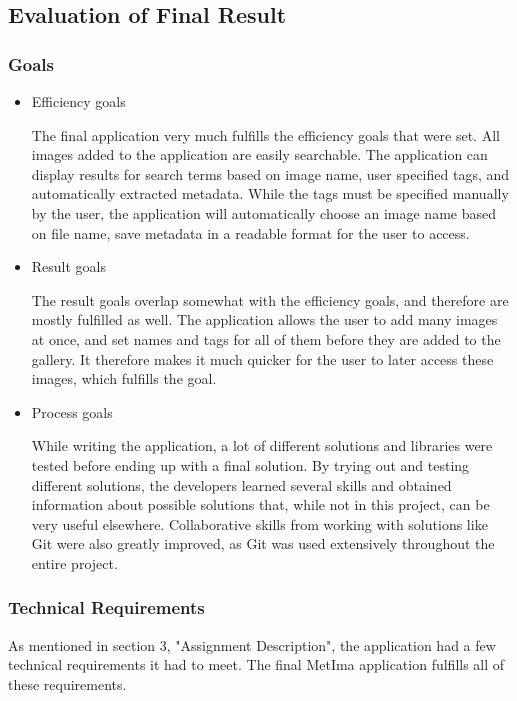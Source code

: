     \subsection{Evaluation of Final Result}
        \subsubsection{Goals}
            \begin{itemize}
                \item Efficiency goals
  
                The final application very much fulfills the efficiency goals that were set. All images added to the application are easily searchable. The application can display results for search terms based on image name, user specified tags, and automatically extracted metadata. While the tags must be specified manually by the user, the application will automatically choose an image name based on file name, save metadata in a readable format for the user to access.

                \item Result goals

                The result goals overlap somewhat with the efficiency goals, and therefore are mostly fulfilled as well. The application allows the user to add many images at once, and set names and tags for all of them before they are added to the gallery. It therefore makes it much quicker for the user to later access these images, which fulfills the goal.
                
                \item Process goals
  
                While writing the application, a lot of different solutions and libraries were tested before ending up with a final solution. By trying out and testing different solutions, the developers learned several skills and obtained information about possible solutions that, while not in this project, can be very useful elsewhere. Collaborative skills from working with solutions like Git were also greatly improved, as Git was used extensively throughout the entire project.

            \end{itemize}
        \subsubsection{Technical Requirements}
            As mentioned in section 3, "Assignment Description", the application had a few technical requirements it had to meet. The final MetIma application fulfills all of these requirements.
            
